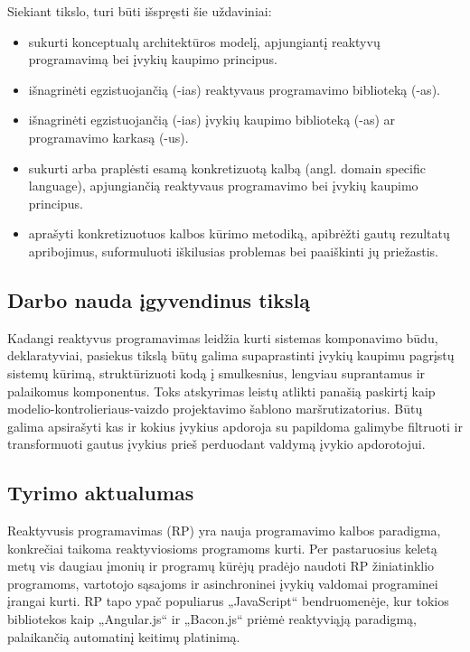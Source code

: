   Siekiant tikslo, turi būti išspręsti šie uždaviniai:

\begin{itemize}
        \item sukurti konceptualų architektūros modelį, apjungiantį reaktyvų programavimą bei įvykių kaupimo principus.
        \item išnagrinėti egzistuojančią (-ias) reaktyvaus programavimo biblioteką (-as).
        \item išnagrinėti egzistuojančią (-ias) įvykių kaupimo biblioteką (-as) ar programavimo karkasą (-us).
        \item sukurti arba praplėsti esamą konkretizuotą kalbą (angl. domain specific language), apjungiančią reaktyvaus programavimo bei įvykių kaupimo principus.
        \item aprašyti konkretizuotuos kalbos kūrimo metodiką, apibrėžti gautų rezultatų apribojimus, suformuluoti iškilusias problemas bei paaiškinti jų priežastis.
\end{itemize}

\subsection{Darbo nauda įgyvendinus tikslą}

Kadangi reaktyvus programavimas leidžia kurti sistemas komponavimo būdu, deklaratyviai, pasiekus tikslą būtų galima supaprastinti įvykių kaupimu pagrįstų sistemų kūrimą, struktūrizuoti kodą į smulkesnius, lengviau suprantamus ir palaikomus komponentus. Toks atskyrimas leistų atlikti panašią paskirtį kaip modelio-kontrolieriaus-vaizdo projektavimo šablono maršrutizatorius. Būtų galima apsirašyti kas ir kokius įvykius apdoroja su papildoma galimybe filtruoti ir transformuoti gautus įvykius prieš perduodant valdymą įvykio apdorotojui.

\subsection{Tyrimo aktualumas}

Reaktyvusis programavimas (RP) yra nauja programavimo kalbos paradigma, konkrečiai taikoma reaktyviosioms programoms kurti. Per pastaruosius keletą metų vis daugiau įmonių ir programų kūrėjų pradėjo naudoti RP žiniatinklio programoms, vartotojo sąsajoms ir asinchroninei įvykių valdomai programinei įrangai kurti. RP tapo ypač populiarus „JavaScript“ bendruomenėje, kur tokios bibliotekos kaip „Angular.js“ ir „Bacon.js“ priėmė reaktyviąją paradigmą, palaikančią automatinį keitimų platinimą.

